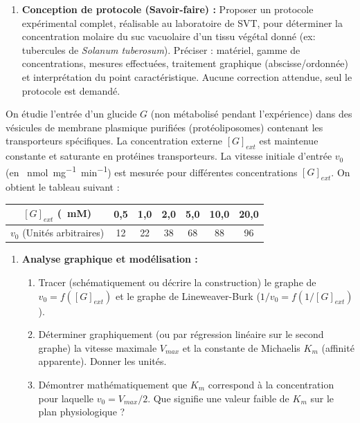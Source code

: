 \documentclass[11pt]{article}
\begin{document}
\begin{exercice}
\begin{enumerate}
\begin{enumerate}
    \end{enumerate}
    \item \textbf{Conception de protocole (Savoir-faire) :} Proposer un protocole expérimental complet, réalisable au laboratoire de SVT, pour déterminer la concentration molaire du suc vacuolaire d'un tissu végétal donné (ex: tubercules de \textit{Solanum tuberosum}). Préciser : matériel, gamme de concentrations, mesures effectuées, traitement graphique (abscisse/ordonnée) et interprétation du point caractéristique. Aucune correction attendue, seul le protocole est demandé.
\end{enumerate}
\end{exercice}

\begin{exercice}
On étudie l'entrée d'un glucide $G$ (non métabolisé pendant l'expérience) dans des vésicules de membrane plasmique purifiées (protéoliposomes) contenant les transporteurs spécifiques. La concentration externe $[G]_{ext}$ est maintenue constante et saturante en protéines transporteurs. La vitesse initiale d'entrée $v_0$ (en \SI{}{nmol.mg^{-1}.min^{-1}}) est mesurée pour différentes concentrations $[G]_{ext}$. On obtient le tableau suivant :
\begin{center}
\begin{tabular}{c|cccccc}
$[G]_{ext}$ (\SI{}{mM}) & 0,5 & 1,0 & 2,0 & 5,0 & 10,0 & 20,0 \\
\hline
$v_0$ (Unités arbitraires) & 12 & 22 & 38 & 68 & 88 & 96 \\
\end{tabular}
\end{center}
\begin{enumerate}
    \item \textbf{Analyse graphique et modélisation :} 
    \begin{enumerate}
        \item Tracer (schématiquement ou décrire la construction) le graphe de $v_0 = f([G]_{ext})$ et le graphe de Lineweaver-Burk ($1/v_0 = f(1/[G]_{ext})$). 
        \item Déterminer graphiquement (ou par régression linéaire sur le second graphe) la vitesse maximale $V_{max}$ et la constante de Michaelis $K_m$ (affinité apparente). Donner les unités.
        \item Démontrer mathématiquement que $K_m$ correspond à la concentration pour laquelle $v_0 = V_{max}/2$. Que signifie une valeur faible de $K_m$ sur le plan physiologique ?

\end{enumerate}
\end{enumerate}
\end{exercice}
\end{document}
